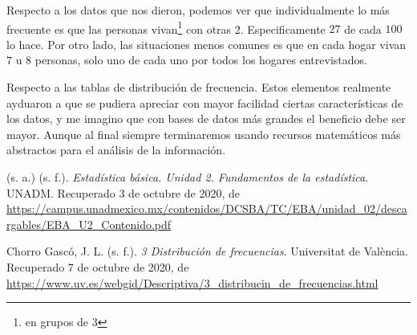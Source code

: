 \documentclass[12pt]{article}
\begin{document}
	\par Respecto a los datos que nos dieron, podemos ver que individualmente lo m\'as frecuente es que las personas vivan\footnote{en grupos de 3} con otras 2. Especificamente $27$ de cada $100$ lo hace. Por otro lado, las situaciones menos comunes es que en cada hogar vivan $7$ u $8$ personas, solo uno de cada uno por todos los hogares entrevistados.
	\par Respecto a las tablas de distribución de frecuencia. Estos elementos realmente ayduaron a que se pudiera apreciar con mayor facilidad ciertas caracter\'isticas de los datos, y me imagino que con bases de datos m\'as grandes el beneficio debe ser mayor. Aunque al final siempre terminaremos usando recursos matem\'aticos m\'as abstractos para el an\'alisis de la informaci\'on.

	




\begin{thebibliography}{X}
	 (s. a.) (s. f.). \textit{Estadística básica. Unidad 2. Fundamentos de la estadística}. UNADM. Recuperado 3 de octubre de 2020, de \url{https://campus.unadmexico.mx/contenidos/DCSBA/TC/EBA/unidad_02/descargables/EBA_U2_Contenido.pdf}
	
	 Chorro Gascó, J. L. (s. f.). \textit{3 Distribución de frecuencias}. Universitat de València. Recuperado 7 de octubre de 2020, de \url{https://www.uv.es/webgid/Descriptiva/3_distribucin_de_frecuencias.html}
	

\end{thebibliography}
\end{document}
